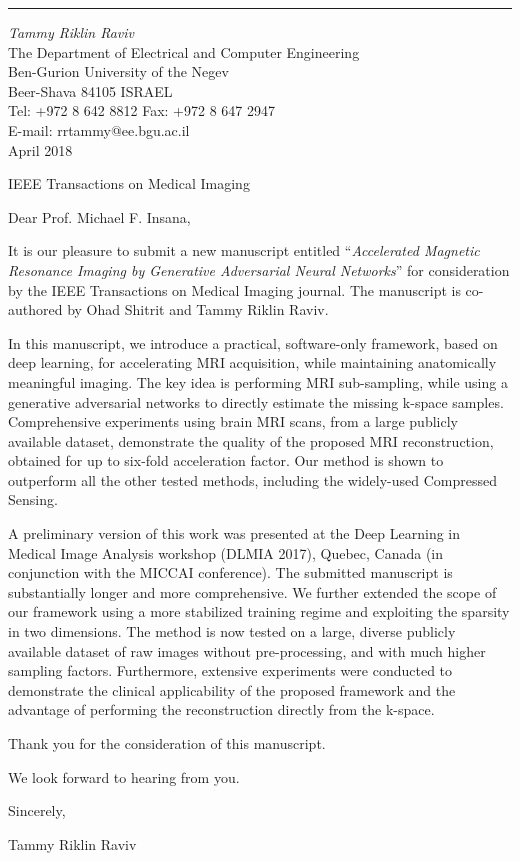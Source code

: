 \documentclass[12pt]{article}
\begin{document}
\thispagestyle{empty}


\sloppy

\vskip0.3cm
\hrule width11.5cm height1pt %
\vskip0.1cm
{\it Tammy Riklin Raviv}\\[0.05cm]
{\small The Department of Electrical and Computer Engineering} \\[0.07cm]
{\small Ben-Gurion University of the Negev} \\
{\small Beer-Shava 84105 {\hskip6pt} ISRAEL}\\[0.1cm]
{\scriptsize Tel: +972 8 642 8812}\hspace{8pt}
               {\scriptsize Fax: +972 8 647 2947}\\
{\scriptsize E-mail: \hspace{1pt} rrtammy@ee.bgu.ac.il}\\

\vspace{-0.7cm}
\hfill April 2018


IEEE Transactions on Medical Imaging
\vspace{0.2cm}

Dear Prof. Michael F. Insana, 


\vspace{0.2cm}

It is our pleasure to submit a new manuscript entitled  ``{\it Accelerated Magnetic Resonance Imaging by Generative Adversarial Neural Networks}'' for
consideration by the IEEE Transactions on Medical Imaging journal. 
The manuscript is co-authored by Ohad Shitrit and Tammy Riklin Raviv.

In this manuscript, we introduce a practical, software-only framework, based on deep learning, for accelerating MRI acquisition, while maintaining anatomically meaningful imaging. The key idea is performing MRI sub-sampling, while using a generative adversarial networks to directly estimate the missing k-space samples.
Comprehensive experiments using brain MRI scans, from a large publicly available dataset, demonstrate the quality of the proposed MRI reconstruction, obtained for up to six-fold acceleration factor. 
Our method is shown to outperform all the other tested methods, including the widely-used Compressed Sensing.


A preliminary version of this work was presented at the Deep Learning in Medical Image Analysis workshop (DLMIA 2017), Quebec, Canada
(in conjunction with the MICCAI conference). The submitted manuscript is substantially
longer and more comprehensive. We further extended the scope of our framework using a more stabilized training regime and exploiting the sparsity in two dimensions. The method is now tested on a large, diverse publicly available dataset of raw images without pre-processing, and with much higher sampling factors. Furthermore, extensive experiments were conducted to demonstrate the clinical applicability of the proposed framework and the advantage of performing the reconstruction directly from the k-space.

Thank you for the consideration of this manuscript. 

We look forward to hearing from you.

\vspace{1cm}


Sincerely,

\vspace{0.2cm}

Tammy Riklin Raviv
\end{document}
